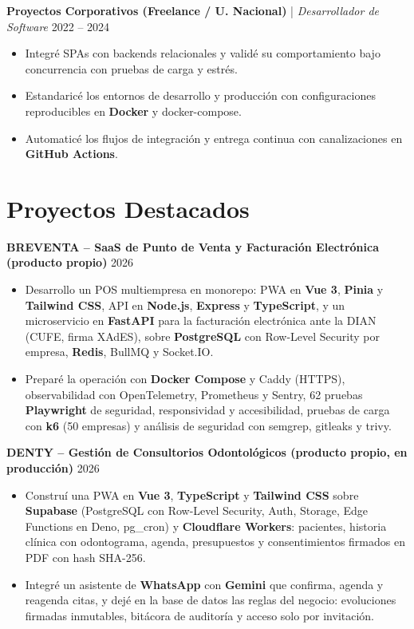\documentclass[11pt,a4paper]{article}
\begin{document}
\vspace{0.2cm}

\noindent
\textbf{Proyectos Corporativos (Freelance / U. Nacional)} | \textit{Desarrollador de Software} \hfill 2022 – 2024
\begin{itemize}[leftmargin=*, noitemsep, topsep=2pt]
    \item Integré SPAs con backends relacionales y validé su comportamiento bajo concurrencia con pruebas de carga y estrés.
    \item Estandaricé los entornos de desarrollo y producción con configuraciones reproducibles en \textbf{Docker} y docker-compose.
    \item Automaticé los flujos de integración y entrega continua con canalizaciones en \textbf{GitHub Actions}.
\end{itemize}

\section*{Proyectos Destacados}

\noindent
\textbf{BREVENTA – SaaS de Punto de Venta y Facturación Electrónica (producto propio)} \hfill 2026
\begin{itemize}[leftmargin=*, noitemsep, topsep=2pt]
    \item Desarrollo un POS multiempresa en monorepo: PWA en \textbf{Vue 3}, \textbf{Pinia} y \textbf{Tailwind CSS}, API en \textbf{Node.js}, \textbf{Express} y \textbf{TypeScript}, y un microservicio en \textbf{FastAPI} para la facturación electrónica ante la DIAN (CUFE, firma XAdES), sobre \textbf{PostgreSQL} con Row-Level Security por empresa, \textbf{Redis}, BullMQ y Socket.IO.
    \item Preparé la operación con \textbf{Docker Compose} y Caddy (HTTPS), observabilidad con OpenTelemetry, Prometheus y Sentry, 62 pruebas \textbf{Playwright} de seguridad, responsividad y accesibilidad, pruebas de carga con \textbf{k6} (50 empresas) y análisis de seguridad con semgrep, gitleaks y trivy.
\end{itemize}

\vspace{0.2cm}

\noindent
\textbf{DENTY – Gestión de Consultorios Odontológicos (producto propio, en producción)} \hfill 2026
\begin{itemize}[leftmargin=*, noitemsep, topsep=2pt]
    \item Construí una PWA en \textbf{Vue 3}, \textbf{TypeScript} y \textbf{Tailwind CSS} sobre \textbf{Supabase} (PostgreSQL con Row-Level Security, Auth, Storage, Edge Functions en Deno, pg\_cron) y \textbf{Cloudflare Workers}: pacientes, historia clínica con odontograma, agenda, presupuestos y consentimientos firmados en PDF con hash SHA-256.
    \item Integré un asistente de \textbf{WhatsApp} con \textbf{Gemini} que confirma, agenda y reagenda citas, y dejé en la base de datos las reglas del negocio: evoluciones firmadas inmutables, bitácora de auditoría y acceso solo por invitación.
\end{itemize}
\end{document}
